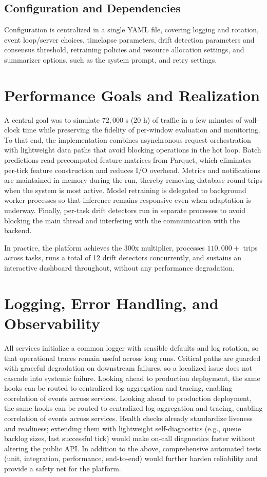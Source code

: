 \subsection{Configuration and Dependencies}
Configuration is centralized in a single YAML file, covering logging and rotation, event loop/server choices, timelapse parameters, drift detection parameters and consensus threshold, retraining policies and resource allocation settings, and summarizer options, such as the system prompt, and retry settings.

\section{Performance Goals and Realization}
A central goal was to simulate $72{,}000$ s (20 h) of traffic in a few minutes of wall-clock time while preserving the fidelity of per-window evaluation and monitoring. To that end, the implementation combines asynchronous request orchestration with lightweight data paths that avoid blocking operations in the hot loop. Batch predictions read precomputed feature matrices from Parquet, which eliminates per-tick feature construction and reduces I/O overhead. Metrics and notifications are maintained in memory during the run, thereby removing database round-trips when the system is most active. Model retraining is delegated to background worker processes so that inference remains responsive even when adaptation is underway. Finally, per-task drift detectors run in separate processes to avoid blocking the main thread and interfering with the communication with the backend.

In practice, the platform achieves the 300x multiplier, processes $110{,}000+$ trips across tasks, runs a total of 12 drift detectors concurrently, and sustains an interactive dashboard throughout, without any performance degradation.

\section{Logging, Error Handling, and Observability}
All services initialize a common logger with sensible defaults and log rotation, so that operational traces remain useful across long runs.
Critical paths are guarded with graceful degradation on downstream failures, so a localized issue does not cascade into systemic failure.
Looking ahead to production deployment, the same hooks can be routed to centralized log aggregation and tracing, enabling correlation of events across services.
Looking ahead to production deployment, the same hooks can be routed to centralized log aggregation and tracing, enabling correlation of events across services. Health checks already standardize liveness and readiness; extending them with lightweight self-diagnostics (e.g., queue backlog sizes, last successful tick) would make on-call diagnostics faster without altering the public API.
In addition to the above, comprehensive automated tests (unit, integration, performance, end-to-end) would further harden reliability and provide a safety net for the platform.

